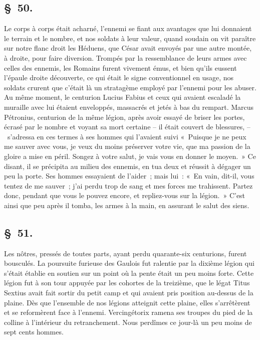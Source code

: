 \documentclass[french,twoside]{book} %
\begin{document}
\subsection[{§ 50.}]{ \textsc{§ 50.} }
\noindent Le corps à corps était acharné, l’ennemi se fiant aux avantages que lui donnaient le terrain et le nombre, et nos soldats à leur valeur, quand soudain on vit paraître sur notre flanc droit les Héduens, que César avait envoyés par une autre montée, à droite, pour faire diversion. Trompés par la ressemblance de leurs armes avec celles des ennemis, les Romains furent vivement émus, et bien qu’ils eussent l’épaule droite découverte, ce qui était le signe conventionnel en usage, nos soldats crurent que c’était là un stratagème employé par l’ennemi pour les abuser. Au même moment, le centurion Lucius Fabius et ceux qui avaient escaladé la muraille avec lui étaient enveloppés, massacrés et jetés à bas du rempart. Marcus Pétronius, centurion de la même légion, après avoir essayé de briser les portes, écrasé par le nombre et voyant sa mort certaine – il était couvert de blessures, – s’adressa en ces termes à ses hommes qui l’avaient suivi « Puisque je ne peux me sauver avec vous, je veux du moins préserver votre vie, que ma passion de la gloire a mise en péril. Songez à votre salut, je vais vous en donner le moyen. » Ce disant, il se précipita au milieu des ennemis, en tua deux et réussit à dégager un peu la porte. Ses hommes essayaient de l’aider ; mais lui : « En vain, dit-il, vous tentez de me sauver ; j’ai perdu trop de sang et mes forces me trahissent. Partez donc, pendant que vous le pouvez encore, et repliez-vous sur la légion. » C'est ainsi que peu après il tomba, les armes à la main, en assurant le salut des siens.
\subsection[{§ 51.}]{ \textsc{§ 51.} }
\noindent Les nôtres, pressés de toutes parts, ayant perdu quarante-six centurions, furent bousculés. La poursuite furieuse des Gaulois fut ralentie par la dixième légion qui s’était établie en soutien sur un point où la pente était un peu moins forte. Cette légion fut à son tour appuyée par les cohortes de la treizième, que le légat Titus Sextius avait fait sortir du petit camp et qui avaient pris position au-dessus de la plaine. Dès que l’ensemble de nos légions atteignit cette plaine, elles s’arrêtèrent et se reformèrent face à l’ennemi. Vercingétorix ramena ses troupes du pied de la colline à l’intérieur du retranchement. Nous perdîmes ce jour-là un peu moins de sept cents hommes.
\end{document}
